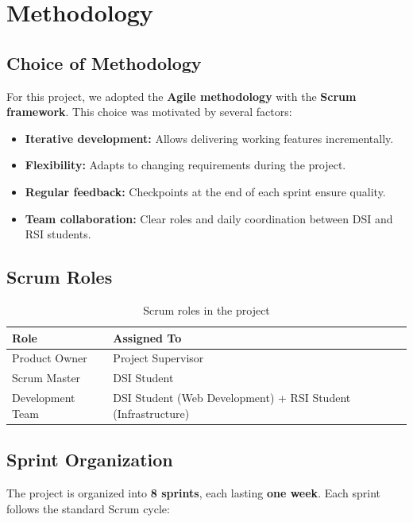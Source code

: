 \section{Methodology}

\subsection{Choice of Methodology}

For this project, we adopted the \textbf{Agile methodology} with the \textbf{Scrum framework}. This choice was motivated by several factors:

\begin{itemize}
  \item \textbf{Iterative development:} Allows delivering working features incrementally.
  \item \textbf{Flexibility:} Adapts to changing requirements during the project.
  \item \textbf{Regular feedback:} Checkpoints at the end of each sprint ensure quality.
  \item \textbf{Team collaboration:} Clear roles and daily coordination between DSI and RSI students.
\end{itemize}

\subsection{Scrum Roles}

\begin{table}[H]
\centering
\caption{Scrum roles in the project}
\label{tab:scrum-roles}
\begin{tabularx}{\textwidth}{|l|X|}
\hline
\rowcolor{blue!15}
\textbf{Role} & \textbf{Assigned To} \\
\hline
Product Owner & Project Supervisor \\
\hline
Scrum Master & DSI Student \\
\hline
Development Team & DSI Student (Web Development) + RSI Student (Infrastructure) \\
\hline
\end{tabularx}
\end{table}

\subsection{Sprint Organization}

The project is organized into \textbf{8 sprints}, each lasting \textbf{one week}. Each sprint follows the standard Scrum cycle:

